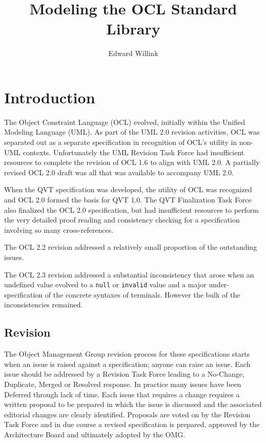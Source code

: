 \documentclass{eceasst}
\title{%
Modeling the OCL Standard Library}
\author{%
Edward Willink\autref{1}}
\institute{%
\autlabel{1} \email{ed \_at\_ willink.me.uk}, \url{http://www.eclipse.org/modeling}\\
Eclipse Modeling Project}
\begin{document}
\maketitle
\section{Introduction}

The Object Constraint Language (OCL) evolved, initially within the Unified Modeling Language (UML). As part of the UML 2.0\cite{UML-2.0} revision activities, OCL was separated out as a separate specification in recognition of OCL's utility in non-UML contexts. Unfortunately the UML Revision Task Force had insufficient resources to complete the revision of OCL 1.6\cite{OCL-1.6} to align with UML 2.0. A partially revised OCL 2.0 draft\cite{OCL-2.0-draft} was all that was available to accompany UML 2.0.

When the QVT specification was developed, the utility of OCL was recognized and OCL 2.0\cite{OCL-2.0} formed the basis for QVT 1.0\cite{QVT-1.0}. The QVT Finalization Task Force also finalized the OCL 2.0 specification, but had insufficient resources to perform the very detailed proof reading and consistency checking for a specification involving so many cross-references.

The OCL 2.2\cite{OCL-2.2} revision addressed a relatively small proportion of the outstanding issues.

The OCL 2.3\cite{OCL-2.3} revision addressed a substantial inconsistency that arose when an undefined value evolved to a \verb|null| or \verb|invalid| value and a major under-specification of the concrete syntaxes of terminals. However the bulk of the inconsistencies remained.

\subsection{Revision}

The Object Management Group revision process for these specifications starts when an issue is raised against a specification; anyone can raise an issue. Each issue should be addressed by a Revision Task Force leading to a No-Change, Duplicate, Merged or Resolved response. In practice many issues have been Deferred through lack of time. Each issue that requires a change requires a written proposal to be prepared in which the issue is discussed and the associated editorial changes are clearly identified. Proposals are voted on by the Revision Task Force and in due course a revised specification is prepared, approved by the Architecture Board and ultimately adopted by the OMG.
\end{document}
